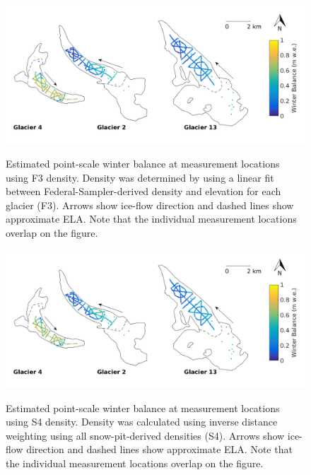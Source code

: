 \documentclass{sfuthesis}
\begin{document}
\begin{figure}[H]
	\centering
	\includegraphics[width = \textwidth]{SWEmap_opt7.png}\\
	\caption[Estimated point-scale winter balance at measurement locations using F3 density]{Estimated point-scale winter balance at measurement locations using F3 density. Density was determined by using a linear fit between Federal-Sampler-derived density and elevation for each glacier (F3). Arrows show ice-flow direction and dashed lines show approximate ELA. Note that the individual measurement locations overlap on the figure.}
	\label{fig:SWEmap_F3}
\end{figure}

\begin{figure}[H]
	\centering
	\includegraphics[width = \textwidth]{SWEmap_opt8.png}\\
	\caption[Estimated point-scale winter balance at measurement locations using S4 density]{Estimated point-scale winter balance at measurement locations using S4 density. Density was calculated using inverse distance weighting using all snow-pit-derived densities (S4). Arrows show ice-flow direction and dashed lines show approximate ELA. Note that the individual measurement locations overlap on the figure.}
	\label{fig:SWEmap_S4}
\end{figure}
\end{document}
